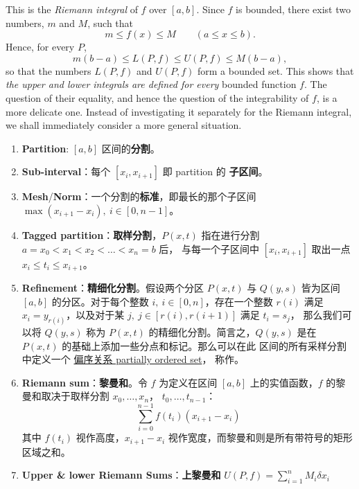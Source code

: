 \documentclass[../poma-notes.tex]{subfiles}
\begin{document}
\begin{definition}
  This is the \textit{Riemann integral} of $f$ over $[a,b]$. Since $f$ is bounded, there exist two numbers,
  $m$ and $M$, such that
  \[
    m \le f(x) \le M \qquad (a \le x \le b).
  \]
  Hence, for every $P$,
  \[
    m(b-a) \le L(P, f) \le U(P, f) \le M(b-a),
  \]
  so that the numbers $L(P, f)$ and $U(P, f)$ form a bounded set. This shows that \textit{the upper and lower
    integrals are defined for every} bounded function $f$. The question of their equality, and hence the question
  of the integrability of $f$, is a more delicate one. Instead of investigating it separately for the Riemann
  integral, we shall immediately consider a more general situation.
\end{definition}

\begin{anote}
  \begin{enumerate}
    \item \textbf{Partition}: $[a, b]$ 区间的\textbf{分割}。
    \item \textbf{Sub-interval}：每个 $[x_i, x_{i+1}]$ 即 partition 的 \textbf{子区间}。
    \item \textbf{Mesh}/\textbf{Norm}：一个分割的\textbf{标准}，即最长的那个子区间 $\max(x_{i+1} - x_i),\ i\in[0, n-1]$。
    \item \textbf{Tagged partition}：\textbf{取样分割}，$P(x,t)$ 指在进行分割 $a = x_0 < x_1 < x_2 < \dots < x_n = b$ 后，
          与每一个子区间中 $[x_i,x_{i+1}]$ 取出一点 $x_i \le t_i \le x_{i+1}$。
    \item \textbf{Refinement}：\textbf{精细化分割}。假设两个分区 $P(x,t)$ 与 $Q(y,s)$ 皆为区间 $[a,b]$ 的分区。对于每个整数
          $i,\ i\in[0,n]$，存在一个整数 $r(i)$ 满足 $x_i = y_{r(i)}$，以及对于某 $j,\ j\in[r(i),r(i+1)]$ 满足 $t_i = s_j$，
          那么我们可以将 $Q(y,s)$ 称为 $P(x,t)$ 的精细化分割。简言之，$Q(y,s)$ 是在 $P(x,t)$ 的基础上添加一些分点和标记。那么可以在此
          区间的所有采样分割中定义一个 \href{https://en.wikipedia.org/wiki/Partially_ordered_set}{偏序关系 partially ordered set}，
          称作。
    \item \textbf{Riemann sum}：\textbf{黎曼和}。令 $f$ 为定义在区间 $[a,b]$ 上的实值函数，$f$ 的黎曼和取决于取样分割 $x_0,\dots,x_n$，
          $t_0,\dots,t_{n-1}$：
          \[
            \sum_{i=0}^{n-1}f(t_i)(x_{i+1}-x_i)
          \]
          其中 $f(t_i)$ 视作高度，$x_{i+1} - x_i$ 视作宽度，而黎曼和则是所有带符号的矩形区域之和。
    \item \textbf{Upper \& lower Riemann Sums}：\textbf{上黎曼和} $U(P,f) = \sum_{i=1}^{n} M_i \delta x_i$

\end{enumerate}
\end{anote}
\end{document}
